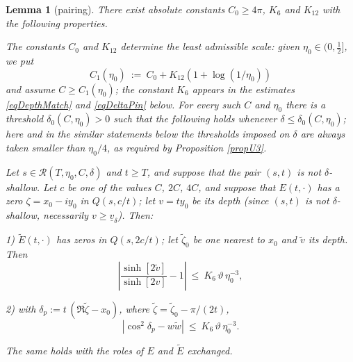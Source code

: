 \documentclass[11pt,twoside,reqno]{amsart}
\def\ti{\tilde}
\def\RR{{\mathcal{R}}}
\def\d{\delta}
\def\uv{\underline{v}_{\d}}
\theoremstyle{plain}
\newtheorem{lemma}{Lemma}
\numberwithin{equation}{section}
\begin{document}
\begin{lemma}[pairing]\label{lemPair}
There exist absolute constants $C_0\geq4\pi$, $K_6$ and $K_{12}$ with the following properties.

The constants $C_0$ and $K_{12}$ determine the least admissible scale: given $\eta_0\in(0,\tfrac12]$, we put
$$C_1(\eta_0)\ :=\ C_0+K_{12}\left(1+\log(1/\eta_0)\right)$$
and assume $C\geq C_1(\eta_0)$; the constant $K_6$ appears in the estimates \eqref{eqDepthMatch} and \eqref{eqDeltaPin} below. For every such $C$ and $\eta_0$ there is a threshold $\d_0(C,\eta_0)>0$ such that the following holds whenever $\d\leq\d_0(C,\eta_0)$; here and in the similar statements below the thresholds imposed on $\d$ are always taken smaller than $\eta_0/4$, as required by Proposition \ref{propU3}.

Let $s\in\RR(T,\eta_0,C,\d)$ and $t\geq T$, and suppose that the pair $(s,t)$ is not $\d$-shallow. Let $c$ be one of the values $C$, $2C$, $4C$, and suppose that $E(t,\cdot)$ has a zero $\zeta=x_0-iy_0$ in $Q(s,c/t)$; let $v=ty_0$ be its depth (since $(s,t)$ is not $\d$-shallow, necessarily $v\geq\uv$). Then:

1) $\ti E(t,\cdot)$ has zeros in $Q(s,2c/t)$; let $\ti\zeta_0$ be one nearest to $x_0$ and $\ti v$ its depth. Then
\begin{equation}
\left|\frac{\sinh[2\ti v]}{\sinh[2v]}-1\right|\ \leq\ K_6\,\vartheta\,\eta_0^{-3},
\label{eqDepthMatch}
\end{equation}

2) with $\d_p:=t\,(\Re\ti\zeta-x_0)$, where $\ti\zeta=\ti\zeta_0-\pi/(2t)$,
\begin{equation}
\left|\cos^2\d_p-w\ti w\right|\ \leq\ K_6\,\vartheta\,\eta_0^{-3}.
\label{eqDeltaPin}
\end{equation}

The same holds with the roles of $E$ and $\ti E$ exchanged.
\end{lemma}
\end{document}
